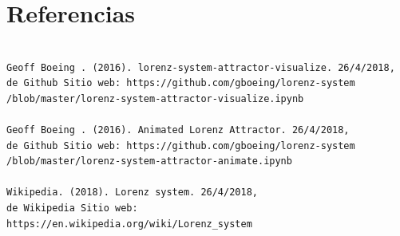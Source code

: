\documentclass[a4paper]{article}
\begin{document}
\section{Referencias}

\begin{verbatim}

Geoff Boeing . (2016). lorenz-system-attractor-visualize. 26/4/2018, 
de Github Sitio web: https://github.com/gboeing/lorenz-system
/blob/master/lorenz-system-attractor-visualize.ipynb

Geoff Boeing . (2016). Animated Lorenz Attractor. 26/4/2018,
de Github Sitio web: https://github.com/gboeing/lorenz-system
/blob/master/lorenz-system-attractor-animate.ipynb

Wikipedia. (2018). Lorenz system. 26/4/2018,
de Wikipedia Sitio web: 
https://en.wikipedia.org/wiki/Lorenz_system

\end{verbatim}
\end{document}
